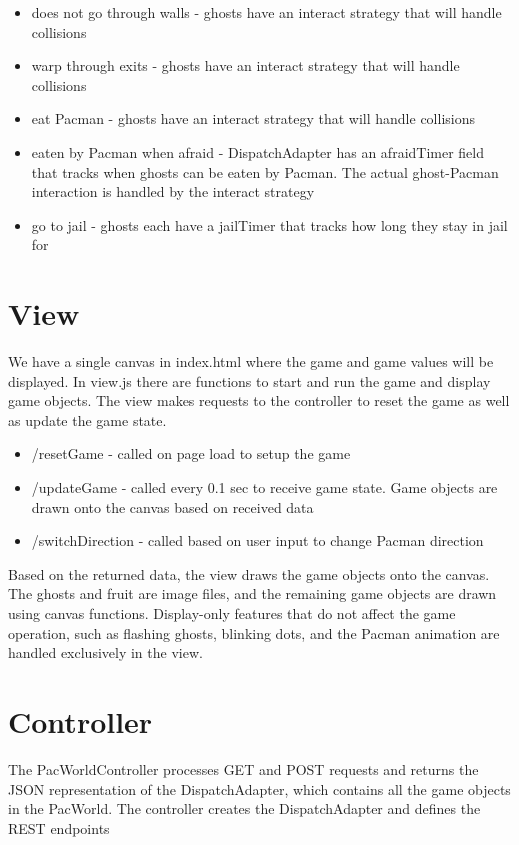 \documentclass[letterpaper, 11pt]{article}
\begin{document}
\begin{itemize}
\begin{itemize}
    \item does not go through walls - ghosts have an interact strategy that will handle collisions
    \item warp through exits - ghosts have an interact strategy that will handle collisions
    \item eat Pacman - ghosts have an interact strategy that will handle collisions
    \item eaten by Pacman when afraid - DispatchAdapter has an afraidTimer field that tracks when ghosts can be eaten by Pacman. The actual ghost-Pacman interaction is handled by the interact strategy
    \item go to jail - ghosts each have a jailTimer that tracks how long they stay in jail for 
  \end{itemize}
\end{itemize}

\section{View}
We have a single canvas in index.html where the game and game values will be displayed. In view.js there are functions to start and run the game and display game objects. The view makes requests to the controller to reset the game as well as update the game state. 

\begin{itemize}
  \item /resetGame - called on page load to setup the game
  \item /updateGame - called every 0.1 sec to receive game state. Game objects are drawn onto the canvas based on received data
  \item /switchDirection - called based on user input to change Pacman direction
\end{itemize}

Based on the returned data, the view draws the game objects onto the canvas. The ghosts and fruit are image files, and the remaining game objects are drawn using canvas functions. Display-only features that do not affect the game operation, such as flashing ghosts, blinking dots, and the Pacman animation are handled exclusively in the view.

\section{Controller}
The PacWorldController processes GET and POST requests and returns the JSON representation of the DispatchAdapter, which contains all the game objects in the PacWorld. The controller creates the DispatchAdapter and defines the REST endpoints \\ 
\end{document}
